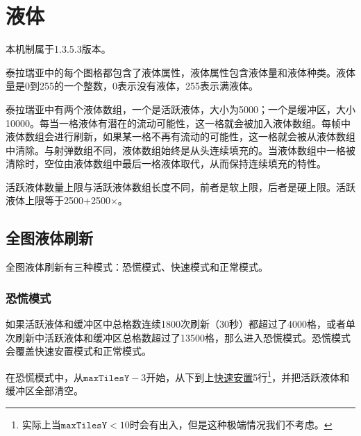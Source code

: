 \chapter{液体}\label{app23}
\begin{note}
本机制属于1.3.5.3版本。
\end{note}

泰拉瑞亚中的每个图格都包含了液体属性，液体属性包含液体量和液体种类。液体量是0到255的一个整数，0表示没有液体，255表示满液体。

泰拉瑞亚中有两个液体数组，一个是活跃液体，大小为5000；一个是缓冲区，大小10000。每当一格液体有潜在的流动可能性，这一格就会被加入液体数组。每帧中液体数组会进行刷新，如果某一格不再有流动的可能性，这一格就会被从液体数组中清除。与射弹数组不同，液体数组始终是从头连续填充的。当液体数组中一格被清除时，空位由液体数组中最后一格液体取代，从而保持连续填充的特性。

活跃液体数量上限与活跃液体数组长度不同，前者是软上限，后者是硬上限。活跃液体上限等于2500+2500$\times$。

\section{全图液体刷新}
全图液体刷新有三种模式：恐慌模式、快速模式和正常模式。

\subsection{恐慌模式}
如果活跃液体和缓冲区中总格数连续1800次刷新（30秒）都超过了4000格，或者单次刷新中活跃液体和缓冲区总格数超过了13500格，那么进入恐慌模式。恐慌模式会覆盖快速安置模式和正常模式。

在恐慌模式中，从$\mathtt{maxTilesY}-3$开始，从下到上\hyperref[app30]{快速安置}5行\footnote{实际上当$\mathtt{maxTilesY}<10$时会有出入，但是这种极端情况我们不考虑。}，并把活跃液体和缓冲区全部清空。

